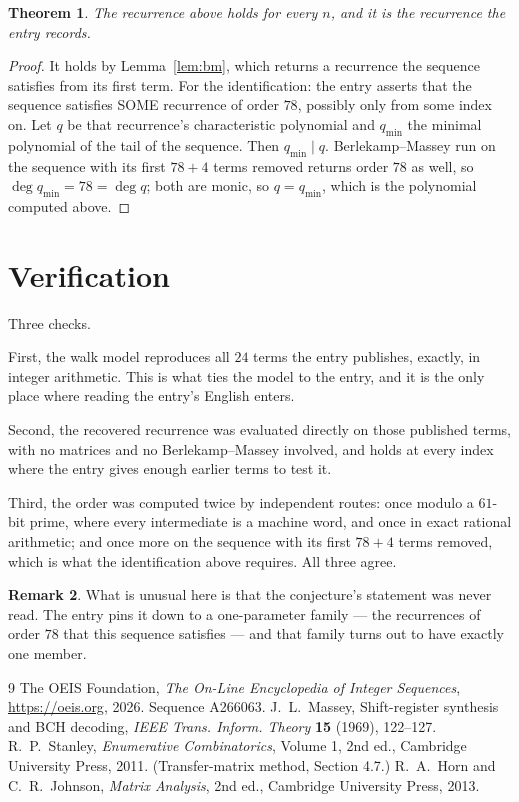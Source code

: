 \documentclass[11pt,a4paper]{article}
\theoremstyle{plain}
\newtheorem{theorem}{Theorem}
\theoremstyle{definition}
\newtheorem{remark}[theorem]{Remark}
\begin{document}
\begin{theorem}
The recurrence above holds for every $n$, and it is the recurrence the entry records.
\end{theorem}

\begin{proof}
It holds by Lemma~\ref{lem:bm}, which returns a recurrence the sequence satisfies from its
first term. For the identification: the entry asserts that the sequence satisfies SOME
recurrence of order $78$, possibly only from some index on. Let $q$ be that recurrence's
characteristic polynomial and $q_{\min}$ the minimal polynomial of the tail of the sequence.
Then $q_{\min}\mid q$. Berlekamp--Massey run on the sequence with its first $78+4$ terms
removed returns order $78$ as well, so $\deg q_{\min}=78=\deg q$; both are monic, so
$q=q_{\min}$, which is the polynomial computed above.
\end{proof}

\section{Verification}

Three checks.

First, the walk model reproduces all $24$ terms the entry publishes, exactly, in integer
arithmetic. This is what ties the model to the entry, and it is the only place where reading
the entry's English enters.

Second, the recovered recurrence was evaluated directly on those published terms, with no
matrices and no Berlekamp--Massey involved, and holds at every index where the entry gives
enough earlier terms to test it.

Third, the order was computed twice by independent routes: once modulo a $61$-bit prime, where
every intermediate is a machine word, and once in exact rational arithmetic; and once more on
the sequence with its first $78+4$ terms removed, which is what the identification above
requires. All three agree.

\begin{remark}
What is unusual here is that the conjecture's statement was never read. The entry pins it down
to a one-parameter family --- the recurrences of order $78$ that this sequence satisfies
--- and that family turns out to have exactly one member.
\end{remark}

\begin{thebibliography}{9}
 The OEIS Foundation, \emph{The On-Line Encyclopedia of Integer
Sequences}, \url{https://oeis.org}, 2026. Sequence A266063.
 J.~L.~Massey, Shift-register synthesis and BCH decoding, \emph{IEEE
Trans. Inform. Theory} \textbf{15} (1969), 122--127.
 R.~P.~Stanley, \emph{Enumerative Combinatorics}, Volume 1, 2nd ed.,
Cambridge University Press, 2011. (Transfer-matrix method, Section 4.7.)
 R.~A.~Horn and C.~R.~Johnson, \emph{Matrix Analysis}, 2nd ed., Cambridge
University Press, 2013.
\end{thebibliography}
\end{document}
